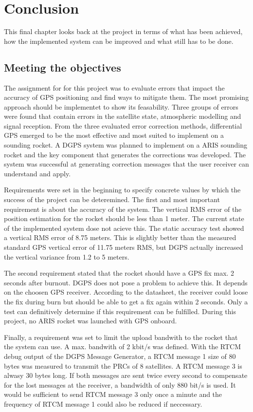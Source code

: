 \chapter{Conclusion}

This final chapter looks back at the project in terms of what has been achieved, how the implemented system can be improved and what still has to be done.


\section{Meeting the objectives}

The assignment for for this project was to evaluate errors that impact the accuracy of GPS positioning and find ways to mitigate them.
The most promising approach should be implementet to show its feasability.
Three groups of errors were found that contain errors in the satellite state, atmospheric modelling and signal reception.
From the three evaluated error correction methods, differential GPS emerged to be the most effective and most suited to implement on a sounding rocket.
A DGPS system was planned to implement on a ARIS sounding rocket and the key component that generates the corrections was developed.
The system was successful at generating correction messages that the user receiver can understand and apply.

Requirements were set in the beginning to specify concrete values by which the success of the project can be deteremined.
The first and most important requirement is about the accuracy of the system.
The vertical RMS error of the position estimation for the rocket should be less than 1 meter.
The current state of the implemented system dose not acieve this.
The static accuracy test showed a vertical RMS error of 8.75 meters.
This is slightly better than the measured standard GPS vertical error of 11.75 meters RMS, but DGPS actually increased the vertical variance from 1.2 to 5 meters.

The second requirement stated that the rocket should have a GPS fix max. 2 seconds after burnout.
DGPS does not pose a problem to achieve this.
It depends on the choosen GPS receiver.
According to the datasheet, the receiver could loose the fix during burn but should be able to get a fix again within 2 seconds.
Only a test can definitively determine if this requirement can be fulfilled.
During this project, no ARIS rocket was launched with GPS onboard.

Finally, a requirement was set to limit the upload bandwith to the rocket that the system can use.
A max. bandwith of 2 kbit/s was defined.
With the RTCM debug output of the DGPS Message Generator, a RTCM message 1 size of 80 bytes was measured to transmit the PRCs of 8 satellites.
A RTCM message 3 is alwasy 30 bytes long.
If both messages are sent twice every second to compensate for the lost messages at the receiver, a bandwidth of only 880 bit/s is used.
It would be sufficient to send RTCM message 3 only once a minute and the frequency of RTCM message 1 could also be reduced if neccessary.


